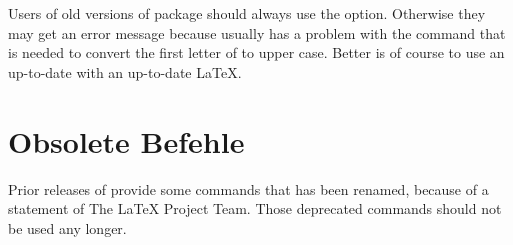 Users of old versions of package  should always use the
 option.  Otherwise they may get an error message because
 usually has a problem with the
 command that is needed to
convert the first letter of  to upper case. Better is of course
to use an up-to-date  with an up-to-date \LaTeX.%
\EndIndexGroup

 
\section{Obsolete Befehle}

Prior releases of  provide some commands that has been
renamed, because of a statement of The \LaTeX{} Project Team. Those deprecated
commands should not be used any longer.

%
% 
\EndIndexGroup
%
\endinput


